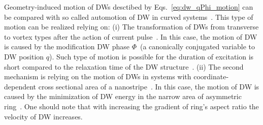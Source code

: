 Geometry-induced motion of DWs desctibed by Eqs.~\eqref{eq:dw_qPhi_motion} can be compared with so called automotion of DW in curved systems~\cite{Chauleau10,Richter16,Mawass17}. This type of motion can be realized relying on: (i) The transformation of DWs from transverse to vortex types after the action of current pulse~\cite{Chauleau10}. In this case, the motion of DW is caused by the modification DW phase $\Phi$~(a canonically conjugated variable to DW position $q$). Such type of motion is possible for the duration of excitation is short compared to the relaxation time of the DW structure~\cite{Chauleau10}. (ii) The second mechanism is relying on the motion of DWs in systems with coordinate-dependent cross sectional area of a nanostripe~\cite{Richter16,Mawass17}. In this case, the motion of DW is caused by the minimization of DW energy in the narrow area of asymmetric ring~\cite{Mawass17}. One should note that with increasing the gradient of ring's aspect ratio the velocity of DW increases.


